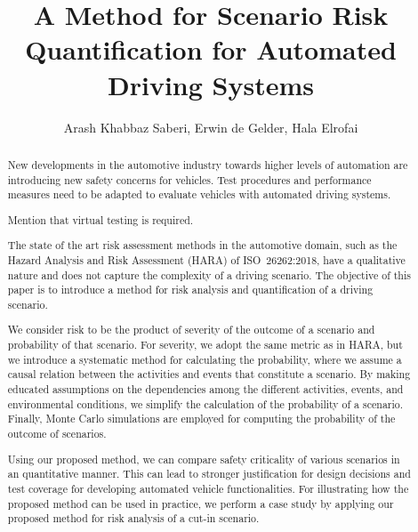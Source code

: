 \documentclass[letterpaper, 10 pt, conference]{ieeeconf}  %
\title{\LARGE \bf
A Method for Scenario Risk Quantification for Automated Driving Systems
}
\author{Arash Khabbaz Saberi, Erwin de Gelder, Hala Elrofai}
\begin{document}
\maketitle
\thispagestyle{empty}
\pagestyle{empty}


\begin{abstract}
	
	

	
	
New developments in the automotive industry towards higher levels of automation are introducing new safety concerns for vehicles. 
Test procedures and performance measures need to be adapted to evaluate vehicles with automated driving systems. 

Mention that virtual testing is required. 

The state of the art risk assessment methods in the automotive domain, such as the Hazard Analysis and Risk Assessment (HARA) of ISO~26262:2018, 
	have a qualitative nature and does not capture the complexity of a driving scenario.
The objective of this paper is to introduce a method for risk analysis and quantification of a driving scenario.

We consider risk to be the product of severity of the outcome of a scenario and probability of that scenario.
For severity, we adopt the same metric as in HARA, but we introduce a systematic method for calculating the probability, where we assume a causal relation between the activities and events that constitute a scenario. 
By making educated assumptions
on the dependencies among the different activities, events, and environmental conditions, we simplify the calculation of the probability of a scenario. Finally, Monte Carlo simulations are employed for computing the probability of the outcome of scenarios.

Using our proposed method, we can compare safety criticality of various scenarios in an quantitative manner. This can lead to stronger justification for design decisions and test coverage for developing automated vehicle functionalities. 
For illustrating how the proposed method can be used in practice, we perform a case study by applying our proposed method for risk analysis of a cut-in scenario.

\end{abstract}
\end{document}
